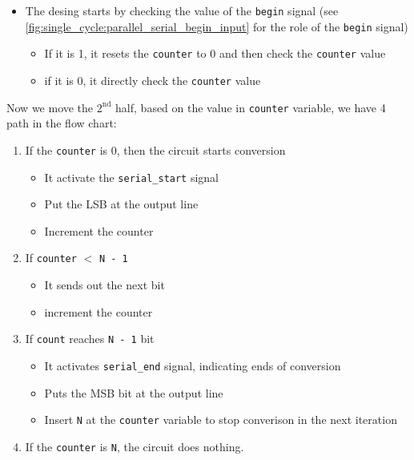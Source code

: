 \begin{itemize}

\item The desing starts by checking the value of the \verb|begin| signal (see \autoref{fig:single_cycle:parallel_serial_begin_input} for the role of the \verb|begin| signal)

	\begin{itemize}
	\item If it is 1, it resets the \verb|counter| to 0 and then check the \verb|counter| value
	
	\item if it is 0, it directly check the \verb|counter| value
	
	\end{itemize}
\end{itemize}

Now we move the $\mathrm{2}^\mathrm{nd}$ half, based on the value in \verb|counter| variable, we have 4 path in the flow chart:

\begin{enumerate}

\item If the \verb|counter| is 0, then the circuit starts conversion

	\begin{itemize}
	\item It activate the \verb|serial_start| signal
	
	\item Put the LSB at the output line
	
	\item Increment the counter
	\end{itemize}

\newpage

\item  If \verb|counter| $<$ \verb|N - 1| 

	\begin{itemize}
	\item It sends out the next bit
	
	\item increment the counter
	\end{itemize}

\item If \verb|count| reaches \verb|N - 1| bit

	\begin{itemize}
	\item It activates \verb|serial_end| signal, indicating ends of conversion
	
	\item Puts the MSB bit at the output line
	
	\item Insert \verb|N| at the \verb|counter| variable to stop converison in the next iteration
	\end{itemize}

\item If the \verb|counter| is \verb|N|, the circuit does nothing.

\end{enumerate}

